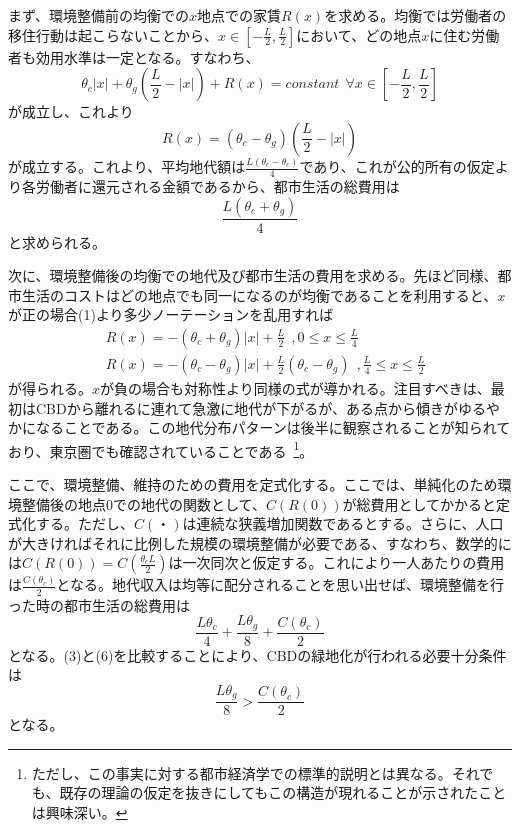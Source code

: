 \documentclass[a4paper]{jarticle}
\begin{document}
まず、環境整備前の均衡での$x$地点での家賃$R(x)$を求める。均衡では労働者の移住行動は起こらないことから、$x \in [-\frac{L}{2}, \frac{L}{2}]$において、どの地点$x$に住む労働者も効用水準は一定となる。すなわち、
\[
\theta_c |x| + \theta_g (\frac{L}{2} - |x|) + R(x) = constant \ \ \forall x \in [-\frac{L}{2}, \frac{L}{2}]
\]
が成立し、これより
\begin{equation}
R(x) = (\theta_c - \theta_g)(\frac{L}{2} - |x|)
\end{equation}
が成立する。これより、平均地代額は$\frac{L(\theta_c - \theta_c)}{4}$であり、これが公的所有の仮定より各労働者に還元される金額であるから、都市生活の総費用は
\begin{equation}
\frac{L(\theta_c + \theta_g)}{4}
\end{equation}
と求められる。

次に、環境整備後の均衡での地代及び都市生活の費用を求める。先ほど同様、都市生活のコストはどの地点でも同一になるのが均衡であることを利用すると、$x$が正の場合(1)より多少ノーテーションを乱用すれば
\begin{align}
&R(x) =  -(\theta_c + \theta_g)|x| + \frac{L}{2}\ \  ,0 \leq x \leq \frac{L}{4} \\
&R(x)      =  -(\theta_c - \theta_g)|x| + \frac{L}{2} (\theta_c - \theta_g) \ \ , \frac{L}{4} \leq x \leq \frac{L}{2}
\end{align}
が得られる。$x$が負の場合も対称性より同様の式が導かれる。注目すべきは、最初はCBDから離れるに連れて急激に地代が下がるが、ある点から傾きがゆるやかになることである。この地代分布パターンは後半に観察されることが知られており、東京圏でも確認されていることである~\cite{kanemoto97:urba}\footnote{ただし、この事実に対する都市経済学での標準的説明とは異なる。それでも、既存の理論の仮定を抜きにしてもこの構造が現れることが示されたことは興味深い。}。

ここで、環境整備、維持のための費用を定式化する。ここでは、単純化のため環境整備後の地点0での地代の関数として、$C(R(0))$が総費用としてかかると定式化する。ただし、$C(・)$は連続な狭義増加関数であるとする。さらに、人口が大きければそれに比例した規模の環境整備が必要である、すなわち、数学的には$C(R(0)) = C(\frac{\theta_c L}{2})$は一次同次と仮定する。これにより一人あたりの費用は$\frac{C(\theta_c)}{2}$となる。地代収入は均等に配分されることを思い出せば、環境整備を行った時の都市生活の総費用は
\begin{equation}
\frac{L \theta_c}{4} + \frac{L \theta_g}{8} + \frac{C(\theta_c)}{2}
\end{equation}
となる。(3)と(6)を比較することにより、CBDの緑地化が行われる必要十分条件は
\begin{equation}
\frac{L\theta_g}{8} >\frac{C(\theta_c)}{2}
\end{equation}
となる。
\end{document}
